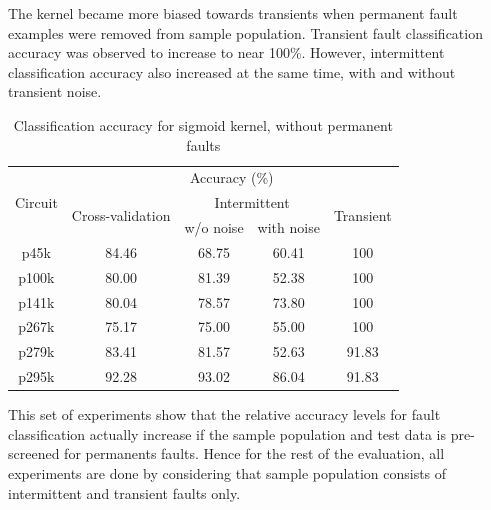 The kernel became more biased towards transients when permanent fault examples were removed from sample population. Transient fault classification accuracy was observed to increase to near 100\%. However, intermittent classification accuracy also increased at the same time, with and without transient noise.

\begin{table}[h]
\captionsetup{justification=centering}
\begin{tabular}{ccccc}
\hline
\multirow{3}{*}{Circuit} & \multicolumn{4}{c}{Accuracy (\%)}                                                                 \\ \cline{2-5} 
                         & \multirow{2}{*}{Cross-validation} & \multicolumn{2}{c}{Intermittent} & \multirow{2}{*}{Transient} \\ \cline{3-4}
                         &                                   & w/o noise      & with noise      &                            \\ \hline
p45k                     & 84.46                             & 68.75          & 60.41           & 100                        \\
p100k                    & 80.00                             & 81.39          & 52.38           & 100                        \\
p141k                    & 80.04                             & 78.57          & 73.80           & 100                        \\
p267k                    & 75.17                             & 75.00          & 55.00           & 100                        \\
p279k                    & 83.41                             & 81.57          & 52.63           & 91.83                      \\
p295k                    & 92.28                             & 93.02          & 86.04           & 91.83                     \\
\hline
\end{tabular}
\caption {Classification accuracy for sigmoid kernel, without permanent faults}
\label{tab:sigwop}
\end{table}

This set of experiments show that the relative accuracy levels for fault classification actually increase if the sample population and test data is pre-screened for permanents faults. Hence for the rest of the evaluation,  all experiments are done by considering that sample population consists of intermittent and transient faults only.

